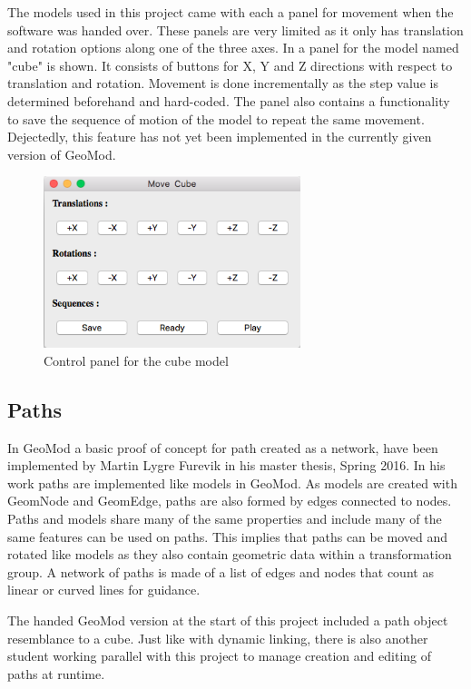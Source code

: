 The models used in this project came with each a panel for movement when the software was handed over. These panels are very limited as it only has translation and rotation options along one of the three axes. In  a panel for the model named "cube" is shown. It consists of buttons for X, Y and Z directions with respect to translation and rotation. Movement is done incrementally as the step value is determined beforehand and hard-coded. The panel also contains a functionality to save the sequence of motion of the model to repeat the same movement. Dejectedly, this feature has not yet been implemented in the currently given version of GeoMod. 

\begin{figure}[ht]
    \centering
    \includegraphics[height=5cm]{images/control_cube.png}
    \caption[Control panel for the cube model]{Control panel for the cube model}
    \label{fig:controlcube}
\end{figure}


\subsection{Paths}

In GeoMod a basic proof of concept for path created as a network, have been implemented by Martin Lygre Furevik in his master thesis, Spring 2016. In his work paths are implemented like models in GeoMod. As models are created with GeomNode and GeomEdge, paths are also formed by edges connected to nodes. Paths and models share many of the same properties and include many of the same features can be used on paths. This implies that paths can be moved and rotated like models as they also contain geometric data within a transformation group. A network of paths is made of a list of edges and nodes that count as linear or curved lines for guidance. 

The handed GeoMod version at the start of this project included a path object resemblance to a cube. Just like with dynamic linking, there is also another student working parallel with this project to manage creation and editing of paths at runtime.